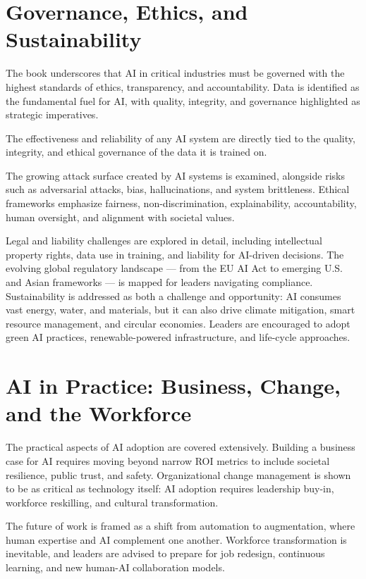 \section*{Governance, Ethics, and Sustainability}
The book underscores that AI in critical industries must be governed with the highest standards of ethics, transparency, and accountability. 
Data is identified as the fundamental fuel for AI, with quality, integrity, and governance highlighted as strategic imperatives.
\begin{notebox}
The effectiveness and reliability of any AI system are directly tied to the quality, integrity, and ethical governance of the data it is trained on.
\end{notebox} 
The growing attack surface created by AI systems is examined, alongside risks such as adversarial attacks, bias, hallucinations, 
and system brittleness. Ethical frameworks emphasize fairness, non-discrimination, explainability, accountability, human oversight, 
and alignment with societal values. 

Legal and liability challenges are explored in detail, including intellectual property rights, data use in training, 
and liability for AI-driven decisions. The evolving global regulatory landscape --- from the EU AI Act to emerging U.S. and Asian frameworks --- 
is mapped for leaders navigating compliance. Sustainability is addressed as both a challenge and opportunity: AI consumes vast energy, water, 
and materials, but it can also drive climate mitigation, smart resource management, and circular economies. Leaders are encouraged to adopt 
green AI practices, renewable-powered infrastructure, and life-cycle approaches.

\section*{AI in Practice: Business, Change, and the Workforce}
The practical aspects of AI adoption are covered extensively. Building a business case for AI requires moving beyond narrow ROI metrics to include 
societal resilience, public trust, and safety. Organizational change management is shown to be as critical as technology itself: 
AI adoption requires leadership buy-in, workforce reskilling, and cultural transformation. 

The future of work is framed as a shift from automation to augmentation, where human expertise and AI complement one another. 
Workforce transformation is inevitable, and leaders are advised to prepare for job redesign, continuous learning, and new human-AI collaboration models. 

